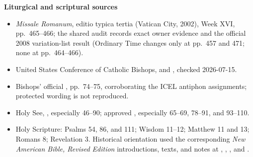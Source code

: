 \begin{deepstudy}
\textbf{Liturgical and scriptural sources}
{\footnotesize
\begin{itemize}[itemsep=0em,topsep=0.15em,parsep=0pt]
\item \emph{Missale Romanum}, editio typica tertia (Vatican City, 2002), Week XVI, pp.~465--466; the shared audit records exact owner evidence and the official 2008 variation-list result (Ordinary Time changes only at pp.~457 and 471; none at pp.~464--466).
\item United States Conference of Catholic Bishops,  and , checked 2026-07-15.
\item Bishops' official , pp.~74--75, corroborating the ICEL antiphon assignments; protected wording is not reproduced.
\item Holy See, , especially 46--90; approved , especially 65--69, 78--91, and 93--110.
\item Holy Scripture: Psalms 54, 86, and 111; Wisdom 11--12; Matthew 11 and 13; Romans 8; Revelation 3. Historical orientation used the corresponding \emph{New American Bible, Revised Edition} introductions, texts, and notes at , , , and .
\end{itemize}}


\end{deepstudy}
